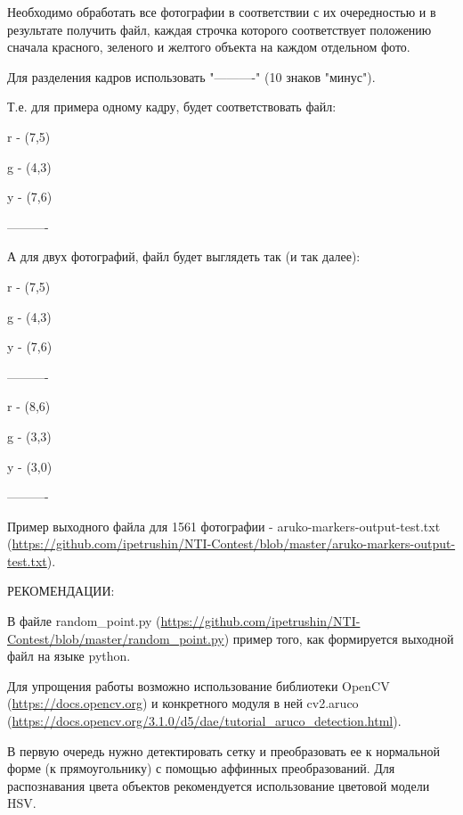 
Необходимо обработать все фотографии в соответствии с их очередностью и в результате получить файл, каждая строчка которого соответствует положению сначала красного, зеленого и желтого объекта на каждом отдельном фото. 

Для разделения кадров использовать "----------" (10 знаков "минус").

Т.е. для примера одному кадру, будет соответствовать файл: 

r - (7,5)

g - (4,3)

y - (7,6)

----------

А для двух фотографий, файл будет выглядеть так (и так далее):

r - (7,5)

g - (4,3)

y - (7,6)

----------

r - (8,6)

g - (3,3)

y - (3,0)

----------

Пример выходного файла для 1561 фотографии -  aruko-markers-output-test.txt (\url{https://github.com/ipetrushin/NTI-Contest/blob/master/aruko-markers-output-test.txt}).

РЕКОМЕНДАЦИИ: 

В файле random\_point.py (\url{https://github.com/ipetrushin/NTI-Contest/blob/master/random_point.py}) пример того, 
как формируется выходной файл на языке python.

Для упрощения работы возможно использование библиотеки OpenCV (\url{https://docs.opencv.org}) и конкретного 
модуля в ней cv2.aruco (\url{https://docs.opencv.org/3.1.0/d5/dae/tutorial_aruco_detection.html}).

В первую очередь нужно детектировать сетку и преобразовать ее к нормальной форме (к прямоугольнику) с 
помощью аффинных преобразований. Для распознавания цвета объектов рекомендуется использование цветовой модели HSV.